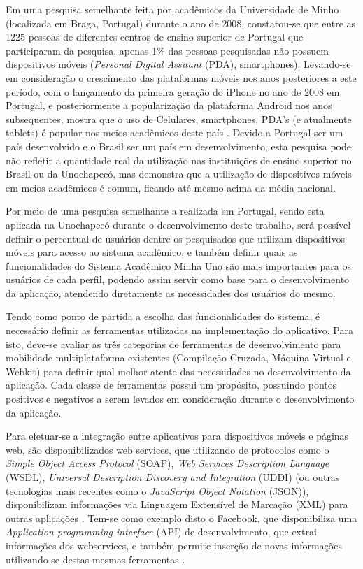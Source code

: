 Em uma pesquisa semelhante feita por acadêmicos da Universidade de Minho (localizada em Braga, Portugal) durante o ano de 2008, constatou-se que entre as 1225 pessoas de diferentes centros de ensino superior de Portugal que participaram da pesquisa, apenas 1\% das pessoas pesquisadas não possuem dispositivos móveis (\emph{Personal Digital Assitant} (PDA), smartphones). Levando-se em consideração o crescimento das plataformas móveis nos anos posteriores a este período, com o lançamento da primeira geração do iPhone no ano de 2008 em Portugal, e posteriormente a popularização da plataforma Android nos anos subsequentes, mostra que o uso de Celulares, smartphones, PDA's (e atualmente tablets) é popular nos meios acadêmicos deste país \cite{UsoTecnologiasMoveisEstudantesPortugueses}. Devido a Portugal ser um país desenvolvido e o Brasil ser um país em desenvolvimento, esta pesquisa pode não refletir a quantidade real da utilização nas instituições de ensino superior no Brasil ou da Unochapecó, mas demonstra que a utilização de dispositivos móveis em meios acadêmicos é comum, ficando até mesmo acima da média nacional. 

Por meio de uma pesquisa semelhante a realizada em Portugal, sendo esta aplicada na Unochapecó durante o desenvolvimento deste trabalho, será possível definir o percentual de usuários dentre os pesquisados que utilizam dispositivos móveis para acesso ao sistema acadêmico, e também definir quais as funcionalidades do Sistema Acadêmico Minha Uno são mais importantes para os usuários de cada perfil, podendo assim servir como base para o desenvolvimento da aplicação, atendendo diretamente as necessidades dos usuários do mesmo.

Tendo como ponto de partida a escolha das funcionalidades do sistema, é necessário definir as ferramentas utilizadas na implementação do aplicativo. Para isto, deve-se avaliar as três categorias de ferramentas de desenvolvimento para mobilidade multiplataforma existentes (Compilação Cruzada, Máquina Virtual e Webkit) para definir qual melhor atente das necessidades no desenvolvimento da aplicação. Cada classe de ferramentas possui um propósito, possuindo pontos positivos e negativos a serem levados em consideração durante o desenvolvimento da aplicação\cite{CrossPlatformMobileDevelopment2011}.

Para efetuar-se a integração entre aplicativos para dispositivos móveis e páginas web, são disponibilizados web services, que utilizando de protocolos como o \emph{Simple Object Access Protocol} (SOAP), \emph{Web Services Description Language} (WSDL), \emph{Universal Description Discovery and Integration} (UDDI) (ou outras tecnologias mais recentes como o \emph{JavaScript Object Notation} (JSON)), disponibilizam informações via Linguagem Extensível de Marcação (XML) para outras aplicações \cite{WebApplicationArchitecture}.  Tem-se como exemplo disto o Facebook, que disponibiliza uma \emph{Application programming interface} (API) de desenvolvimento, que extrai informações dos webservices, e também permite inserção de novas informações utilizando-se destas mesmas ferramentas \cite{Facebook}.



